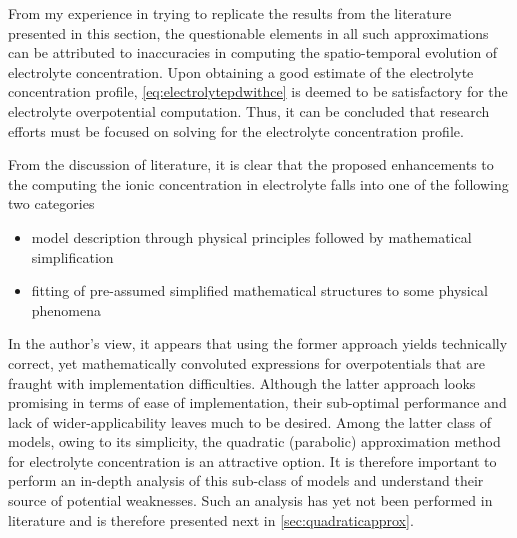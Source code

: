 
From  my experience  in  trying to  replicate the  results  from the  literature
presented in this section, the  questionable elements in all such approximations
can be  attributed to  inaccuracies in  computing the  spatio-temporal evolution
of  electrolyte   concentration.  Upon   obtaining  a   good  estimate   of  the
electrolyte concentration profile, \cref{eq:electrolytepdwithce} is deemed to be
satisfactory  for the  electrolyte overpotential  computation. Thus,  it can  be
concluded that research efforts must be  focused on solving for the electrolyte
concentration profile.

From the discussion of literature, it is clear that the proposed enhancements to
the  computing the  ionic concentration  in electrolyte  falls into  one of  the
following two categories
\begin{itemize}[topsep=0pt,partopsep=0pt,itemsep=0pt]
    \item model description through physical principles followed by mathematical
        simplification
    \item fitting of pre-assumed simplified mathematical structures to some
        physical phenomena
\end{itemize}

In   the  author's   view,   it   appears  that   using   the  former   approach
yields  technically  correct,  yet  mathematically  convoluted  expressions  for
overpotentials that  are fraught with implementation  difficulties. Although the
latter  approach looks  promising  in  terms of  ease  of implementation,  their
sub-optimal  performance  and lack  of  wider-applicability  leaves much  to  be
desired.  Among  the latter  class  of  models,  owing  to its  simplicity,  the
quadratic (parabolic)  approximation method for electrolyte  concentration is an
attractive option. It is therefore important  to perform an in-depth analysis of
this sub-class  of models and  understand their source of  potential weaknesses.
Such  an analysis  has  yet  not been  performed  in  literature and is
therefore presented next in \cref{sec:quadraticapprox}.



